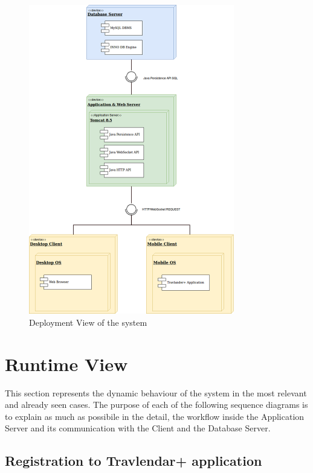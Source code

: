 \documentclass[numbers=noenddot, 12pt, a4paper, oneside]{scrbook}
\begin{document}
\begin{figure}[H]
	\centering
	\includegraphics[width=0.80\textwidth]{images/DeploymentView}
	\caption{Deployment View of the system}
\end{figure}

\section{Runtime View}

This section represents the dynamic behaviour of the system in the most
relevant and already seen cases. The purpose of each of the following sequence diagrams is to explain as much as possibile in the detail, the workflow inside the Application Server and its communication with the Client and the Database Server.

\subsection*{Registration to Travlendar+ application}
\end{document}
